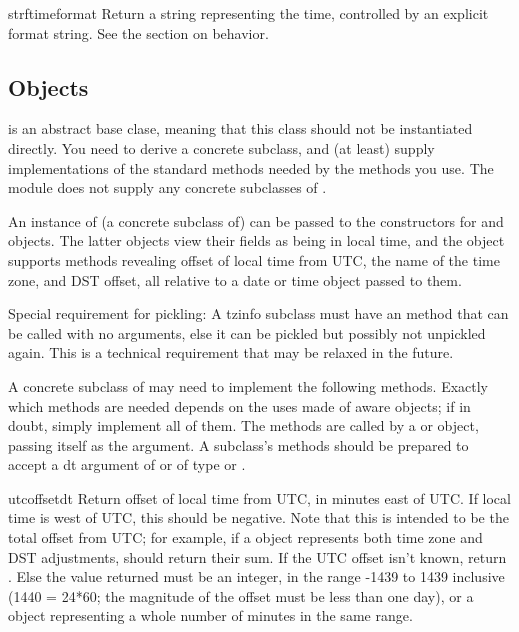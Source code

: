 \begin{methoddesc}{strftime}{format}
    Return a string representing the time, controlled by an explicit
    format string.  See the section on  behavior.
\end{methoddesc}


\subsection{ Objects \label{datetime-tzinfo}}

 is an abstract base clase, meaning that this class
should not be instantiated directly.  You need to derive a concrete
subclass, and (at least) supply implementations of the standard
 methods needed by the  methods you
use. The  module does not supply any concrete
subclasses of .

An instance of (a concrete subclass of)  can be passed
to the constructors for  and  objects.
The latter objects view their fields as being in local time, and the
 object supports methods revealing offset of local time
from UTC, the name of the time zone, and DST offset, all relative to a
date or time object passed to them.

Special requirement for pickling:  A tzinfo subclass must have an
 method that can be called with no arguments, else it
can be pickled but possibly not unpickled again.  This is a technical
requirement that may be relaxed in the future.

A concrete subclass of  may need to implement the
following methods.  Exactly which methods are needed depends on the
uses made of aware  objects; if in doubt, simply
implement all of them.  The methods are called by a 
or  object, passing itself as the argument.  A
 subclass's methods should be prepared to accept a dt
argument of  or of type  or
.

\begin{methoddesc}{utcoffset}{dt}
    Return offset of local time from UTC, in minutes east of UTC.  If
    local time is west of UTC, this should be negative.  Note that this
    is intended to be the total offset from UTC; for example, if a
     object represents both time zone and DST adjustments,
     should return their sum.  If the UTC offset
    isn't known, return .  Else the value returned must be
    an integer, in the range -1439 to 1439 inclusive (1440 = 24*60;
    the magnitude of the offset must be less than one day), or a
     object representing a whole number of minutes
    in the same range.
\end{methoddesc}

